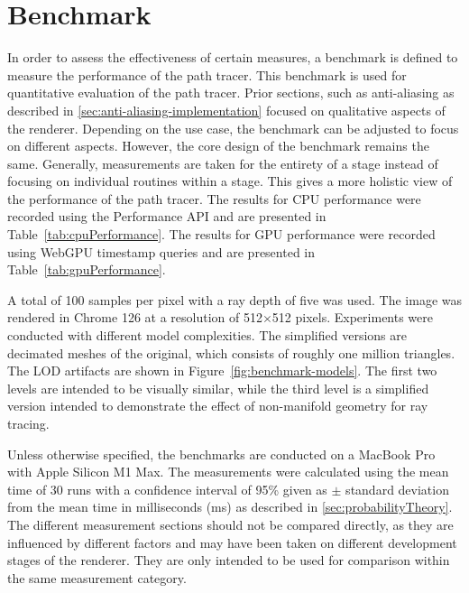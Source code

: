 \section{Benchmark}
\label{sec:benchmark}

In order to assess the effectiveness of certain measures, a benchmark is defined to measure the performance of the path tracer. This benchmark is used for quantitative evaluation of the path tracer. Prior sections, such as anti-aliasing as described in \autoref{sec:anti-aliasing-implementation} focused on qualitative aspects of the renderer. Depending on the use case, the benchmark can be adjusted to focus on different aspects. However, the core design of the benchmark remains the same. Generally, measurements are taken for the entirety of a stage instead of focusing on individual routines within a stage. This gives a more holistic view of the performance of the path tracer. The results for \gls{CPU} performance were recorded using the Performance \gls{API} and are presented in Table~\ref{tab:cpuPerformance}. The results for \gls{GPU} performance were recorded using \gls{WebGPU} timestamp queries and are presented in Table~\ref{tab:gpuPerformance}.

A total of 100 samples per pixel with a ray depth of five was used. The image was rendered in Chrome 126 at a resolution of 512$\times$512 pixels. Experiments were conducted with different model complexities. The simplified versions are decimated meshes of the original, which consists of roughly one million triangles. The \gls{LOD} artifacts are shown in Figure~\ref{fig:benchmark-models}. The first two levels are intended to be visually similar, while the third level is a simplified version intended to demonstrate the effect of non-manifold geometry for ray tracing.

Unless otherwise specified, the benchmarks are conducted on a MacBook Pro with Apple Silicon M1 Max. The measurements were calculated using the mean time of 30 runs with a confidence interval of 95\% given as $\pm$ standard deviation from the mean time in milliseconds (ms) as described in \autoref{sec:probabilityTheory}. The different measurement sections should not be compared directly, as they are influenced by different factors and may have been taken on different development stages of the renderer. They are only intended to be used for comparison within the same measurement category.

